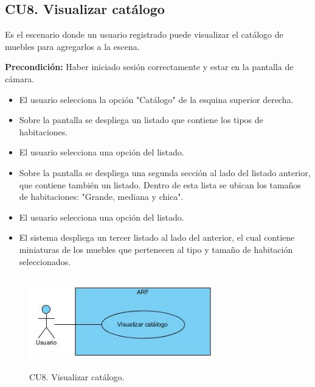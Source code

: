 \subsection{CU8. Visualizar catálogo}\par
Es el escenario donde un usuario registrado puede visualizar el catálogo de muebles para agregarlos a la escena.\par
\textbf{Precondición:} Haber iniciado sesión correctamente y estar en la pantalla de cámara.\par
\begin{itemize}
	\item El usuario selecciona la opción "Catálogo" de la esquina superior derecha.
	\item Sobre la pantalla se despliega un listado que contiene los tipos de habitaciones.
	\item El usuario selecciona una opción del listado.
	\item Sobre la pantalla se despliega una segunda sección al lado del listado anterior, que contiene también un listado. Dentro de esta lista se ubican los tamaños de habitaciones: "Grande, mediana y chica".
	\item El usuario selecciona una opción del listado.
	\item El sistema despliega un tercer listado al lado del anterior, el cual contiene miniaturas de los muebles que pertenecen al tipo y tamaño de habitación seleccionados.
\end{itemize}

\begin{figure}[h!]
	\centering
	\includegraphics[width=8cm,height=4cm]{imagenes/analisis/cu/visualizar_catalogo.jpg}
	\caption{CU8. Visualizar catálogo.}
	\label{fig:visualizarcatalogo}
\end{figure} 

